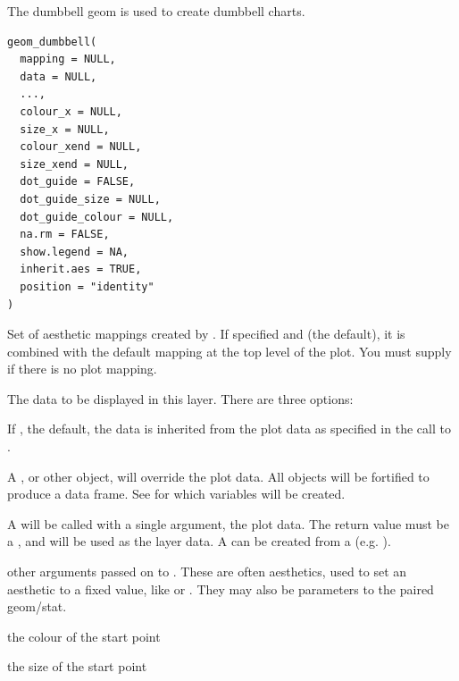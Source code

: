 \documentclass[a4paper]{book}
\begin{document}
\begin{Description}
The dumbbell geom is used to create dumbbell charts.
\end{Description}
%
\begin{Usage}
\begin{verbatim}
geom_dumbbell(
  mapping = NULL,
  data = NULL,
  ...,
  colour_x = NULL,
  size_x = NULL,
  colour_xend = NULL,
  size_xend = NULL,
  dot_guide = FALSE,
  dot_guide_size = NULL,
  dot_guide_colour = NULL,
  na.rm = FALSE,
  show.legend = NA,
  inherit.aes = TRUE,
  position = "identity"
)
\end{verbatim}
\end{Usage}
%
\begin{Arguments}
\begin{ldescription}
\item[\code{mapping}] Set of aesthetic mappings created by . If specified and
 (the default), it is combined with the default mapping
at the top level of the plot. You must supply  if there is no plot
mapping.

\item[\code{data}] The data to be displayed in this layer. There are three
options:

If , the default, the data is inherited from the plot
data as specified in the call to .

A , or other object, will override the plot
data. All objects will be fortified to produce a data frame. See
 for which variables will be created.

A  will be called with a single argument,
the plot data. The return value must be a , and
will be used as the layer data. A  can be created
from a  (e.g. ).

\item[\code{...}] other arguments passed on to . These are
often aesthetics, used to set an aesthetic to a fixed value, like
 or . They may also be parameters
to the paired geom/stat.

\item[\code{colour\_x}] the colour of the start point

\item[\code{size\_x}] the size of the start point


\end{ldescription}
\end{Arguments}
\end{document}
